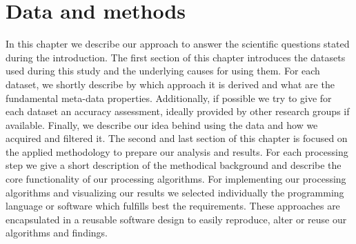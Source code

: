\chapter{Data and methods}
\label{ch:data_methods}
	In this chapter we describe our approach to answer the scientific questions stated during the introduction. The first section of this chapter introduces the datasets used during this study and the underlying causes for using them. For each dataset, we shortly describe by which approach it is derived and what are the fundamental meta-data properties. Additionally, if possible we try to give for each dataset an accuracy assessment, ideally provided by other research groups if available. Finally, we describe our idea behind using the data and how we acquired and filtered it. The second and last section of this chapter is focused on the applied methodology to prepare our analysis and results. For each processing step we give a short description of the methodical background and describe the core functionality of our processing algorithms. For implementing our processing algorithms and visualizing our results we selected individually the programming language or software which fulfills best the requirements. These approaches are encapsulated in a reusable software design to easily reproduce, alter or reuse our algorithms and findings.

